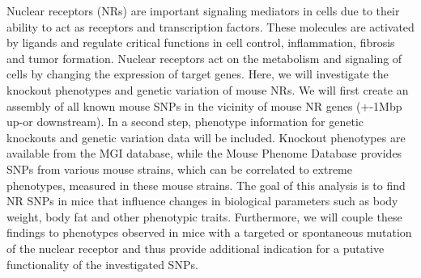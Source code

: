 Nuclear receptors (NRs) are important signaling mediators in cells due to their ability to act as receptors and transcription factors. These molecules are activated by ligands and regulate critical functions in cell control, inflammation, fibrosis and tumor formation. Nuclear receptors act on the metabolism and signaling of cells by changing the expression of target genes. Here, we will investigate the knockout phenotypes and genetic variation of mouse NRs. We will first create an assembly of all known mouse SNPs in the vicinity of mouse NR genes (+-1Mbp up-or downstream). In a second step, phenotype information for genetic knockouts and genetic variation data will be included. Knockout phenotypes are available from the MGI database, while the Mouse Phenome Database provides SNPs from various mouse strains, which can be correlated to extreme phenotypes, measured in these mouse strains. The goal of this analysis is to find NR SNPs in mice that influence changes in biological parameters such as body weight, body fat and other phenotypic traits. Furthermore, we will couple these findings to phenotypes observed in mice with a targeted or spontaneous mutation of the nuclear receptor and thus provide additional indication for a putative functionality of the investigated SNPs.